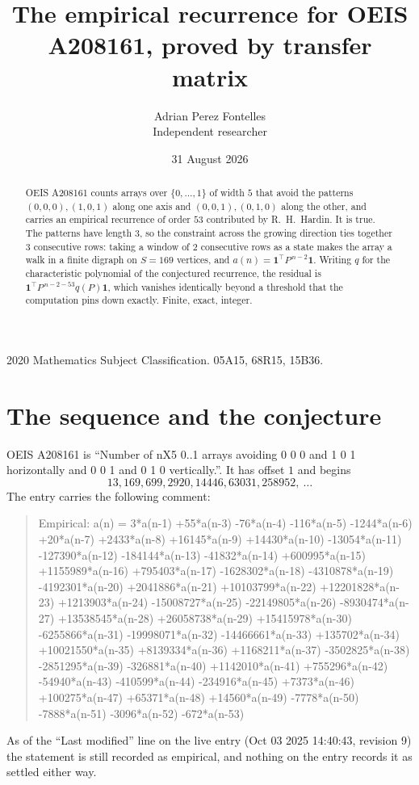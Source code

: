 \documentclass[11pt,a4paper]{article}
\title{The empirical recurrence for OEIS A208161, proved by transfer matrix}
\author{Adrian Perez Fontelles\\ \small Independent researcher}
\date{31 August 2026}
\theoremstyle{plain}
\theoremstyle{definition}
\begin{document}
\maketitle

\begin{abstract}
OEIS A208161 counts arrays over $\{0,\dots,1\}$ of width $5$ that avoid the patterns
$(0,0,0), (1,0,1)$ along one axis and $(0,0,1), (0,1,0)$ along the other, and carries an empirical recurrence of
order $53$ contributed by R.~H.~Hardin. It is true. The patterns have length $3$, so
the constraint across the growing direction ties together $3$ consecutive rows: taking a
window of $2$ consecutive rows as a state makes the array a walk in a finite digraph
on $S=169$ vertices, and $a(n)=\mathbf{1}^{\!\top}P^{\,n-2}\mathbf{1}$. Writing $q$
for the characteristic polynomial of the conjectured recurrence, the residual is
$\mathbf{1}^{\!\top}P^{\,n-2-53}q(P)\mathbf{1}$, which vanishes identically
beyond a threshold that the computation pins down exactly. Finite, exact, integer.
\end{abstract}

\noindent\small 2020 Mathematics Subject Classification. 05A15, 68R15, 15B36.\normalsize

\section{The sequence and the conjecture}

OEIS A208161 is ``Number of nX5 0..1 arrays avoiding 0 0 0 and 1 0 1 horizontally and 0 0 1 and 0 1 0 vertically.''. It has offset
$1$ and begins
\[
13, 169, 699, 2920, 14446, 63031, 258952,\ \dots
\]
The entry carries the following comment:
\begin{quote}\small
Empirical: a(n) = 3*a(n-1) +55*a(n-3) -76*a(n-4) -116*a(n-5) -1244*a(n-6) +20*a(n-7) +2433*a(n-8) +16145*a(n-9) +14430*a(n-10) -13054*a(n-11) -127390*a(n-12) -184144*a(n-13) -41832*a(n-14) +600995*a(n-15) +1155989*a(n-16) +795403*a(n-17) -1628302*a(n-18) -4310878*a(n-19) -4192301*a(n-20) +2041886*a(n-21) +10103799*a(n-22) +12201828*a(n-23) +1213903*a(n-24) -15008727*a(n-25) -22149805*a(n-26) -8930474*a(n-27) +13538545*a(n-28) +26058738*a(n-29) +15415978*a(n-30) -6255866*a(n-31) -19998071*a(n-32) -14466661*a(n-33) +135702*a(n-34) +10021550*a(n-35) +8139334*a(n-36) +1168211*a(n-37) -3502825*a(n-38) -2851295*a(n-39) -326881*a(n-40) +1142010*a(n-41) +755296*a(n-42) -54940*a(n-43) -410599*a(n-44) -234916*a(n-45) +7373*a(n-46) +100275*a(n-47) +65371*a(n-48) +14560*a(n-49) -7778*a(n-50) -7888*a(n-51) -3096*a(n-52) -672*a(n-53)
\end{quote}
As of the ``Last modified'' line on the live entry (Oct 03 2025 14:40:43, revision
9) the statement is still recorded as empirical, and nothing on the entry
records it as settled either way.
\end{document}
